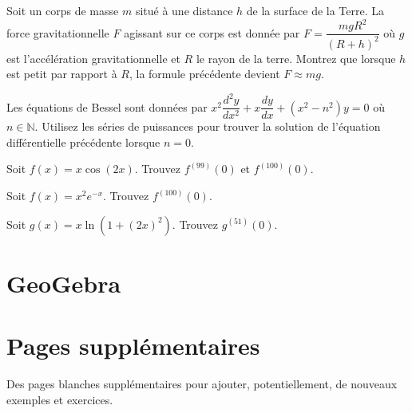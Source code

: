 \documentclass[]{book}
\theoremstyle{definition}
\theoremstyle{definition}
\theoremstyle{definition}
\theoremstyle{remark}
\let\BeginKnitrBlock\begin \let\EndKnitrBlock\end
\begin{document}
\BeginKnitrBlock{example}
\protect\hypertarget{exm:unnamed-chunk-36}{}{\label{exm:unnamed-chunk-36}
}Soit un corps de masse \(m\) situé à une distance \(h\) de la surface
de la Terre. La force gravitationnelle \(F\) agissant sur ce corps est
donnée par \(F=\dfrac{mgR^2}{(R+h)^2}\) où \(g\) est l'accélération
gravitationnelle et \(R\) le rayon de la terre. Montrez que lorsque
\(h\) est petit par rapport à \(R\), la formule précédente devient
\(F\approx mg\).
\EndKnitrBlock{example}
\vspace*{10cm}

\BeginKnitrBlock{example}
\protect\hypertarget{exm:unnamed-chunk-37}{}{\label{exm:unnamed-chunk-37}
}Les équations de Bessel sont données par
\(x^2\dfrac{d^2y}{dx^2}+x\dfrac{dy}{dx}+(x^2-n^2)y=0\) où
\(n\in\mathbb{N}\). Utilisez les séries de puissances pour trouver la
solution de l'équation différentielle précédente lorsque \(n=0\).
\EndKnitrBlock{example}
\vspace*{20cm}

\BeginKnitrBlock{example}
\protect\hypertarget{exm:unnamed-chunk-38}{}{\label{exm:unnamed-chunk-38}
}Soit \(f(x)=x\cos(2x)\). Trouvez \(f^{(99)}(0)\) et \(f^{(100)}(0)\).
\EndKnitrBlock{example}
\vspace*{10cm}

\BeginKnitrBlock{example}
\protect\hypertarget{exm:unnamed-chunk-39}{}{\label{exm:unnamed-chunk-39}
}Soit \(f(x)=x^2e^{-x}\). Trouvez \(f^{(100)}(0)\).
\EndKnitrBlock{example}
\vspace*{10cm}

\BeginKnitrBlock{example}
\protect\hypertarget{exm:unnamed-chunk-40}{}{\label{exm:unnamed-chunk-40}
}Soit \(g(x)=x\ln(1+(2x)^2)\). Trouvez \(g^{(51)}(0)\).
\EndKnitrBlock{example}
\vspace*{10cm}

\hypertarget{geogebra-taylor}{%
\section{GeoGebra}\label{geogebra-taylor}}

\hypertarget{applet_container}{}

\newpage

\hypertarget{pages-supplementaires}{%
\section{Pages supplémentaires}\label{pages-supplementaires}}

Des pages blanches supplémentaires pour ajouter, potentiellement, de
nouveaux exemples et exercices.
\end{document}
